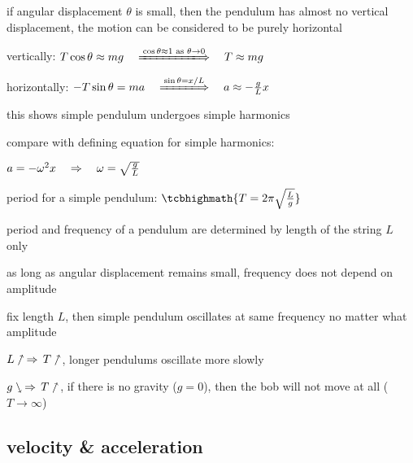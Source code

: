 if angular displacement $\theta$ is small, then the pendulum has almost no vertical displacement, the motion can be considered to be purely horizontal
		
vertically: $T\cos\theta \approx mg \quad \xLongrightarrow{\cos\theta\approx1 \text{ as } \theta\to0} \quad T\approx mg$
		
horizontally: $-T\sin\theta = ma \quad \xLongrightarrow{\sin\theta=x/L} \quad a \approx -\frac{g}{L}x$

this shows simple pendulum undergoes simple harmonics
	
compare with defining equation for simple harmonics:

{

\centering

$a=-\omega^2x \quad \Rightarrow \quad \omega = \sqrt{\frac{g}{L}}$

}
	
period for a simple pendulum: $\tcbhighmath{T= 2\pi\sqrt{\frac{L}{g}}}$

\cmt period and frequency of a pendulum are determined by length of the string $L$ only

as long as angular displacement remains small, frequency does not depend on amplitude

fix length $L$, then simple pendulum oscillates at same frequency no matter what amplitude

\cmt $L \nnearrow \, \Rightarrow \, T \nnearrow$, longer pendulums oscillate more slowly

\cmt $g \ssearrow \, \Rightarrow \, T \nnearrow$, if there is no gravity ($g=0$), then the bob will not move at all  ($T\to \infty$)





\subsection{velocity \& acceleration}

